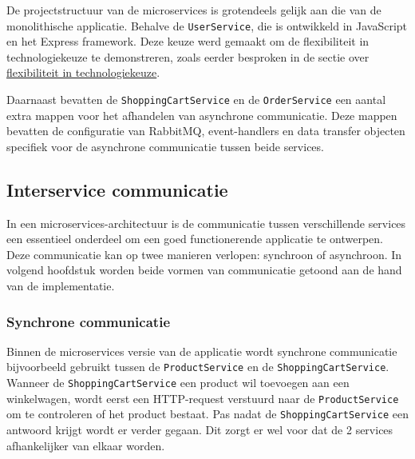 De projectstructuur van de microservices is grotendeels gelijk aan die van de monolithische applicatie. Behalve de \texttt{UserService}, die is ontwikkeld in JavaScript en het Express framework. Deze keuze werd gemaakt om de flexibiliteit in technologiekeuze te demonstreren, zoals eerder besproken in de sectie over \hyperref[sec:flexibiliteit_technologiekeuze]{flexibiliteit in technologiekeuze}.

Daarnaast bevatten de \texttt{ShoppingCartService} en de \texttt{OrderService} een aantal extra mappen voor het afhandelen van asynchrone communicatie. Deze mappen bevatten de configuratie van RabbitMQ, event-handlers en data transfer objecten specifiek voor de asynchrone communicatie tussen beide services.

\subsection{Interservice communicatie}

In een microservices-architectuur is de communicatie tussen verschillende services een essentieel onderdeel om een goed functionerende applicatie te ontwerpen. Deze communicatie kan op twee manieren verlopen: synchroon of asynchroon. In volgend hoofdstuk worden beide vormen van communicatie getoond aan de hand van de implementatie.

\subsubsection{Synchrone communicatie}

Binnen de microservices versie van de applicatie wordt synchrone communicatie bijvoorbeeld gebruikt tussen de \texttt{ProductService} en de \texttt{ShoppingCartService}. Wanneer de \texttt{ShoppingCartService} een product wil toevoegen aan een winkelwagen, wordt eerst een HTTP-request verstuurd naar de \texttt{ProductService} om te controleren of het product bestaat. Pas nadat de \texttt{ShoppingCartService} een antwoord krijgt wordt er verder gegaan. Dit zorgt er wel voor dat de 2 services afhankelijker van elkaar worden.
\medskip

